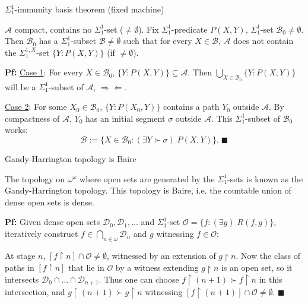 \begin{frame}{$\Sigma_1^{1}$-immunity basis theorem (fixed machine)}
  \begin{lemma}
    $\mathcal{A}$ compact, contains no $\Sigma_1^{1}$-set
    ($\neq\emptyset$). Fix $\Sigma_1^{1}$-predicate $P(X,Y)$,
    $\Sigma_1^{1}$-set $\mathcal{B}_0\neq\emptyset$. Then
    $\mathcal{B}_0$ has a $\Sigma_1^{1}$-subset
    $\mathcal{B}\neq\emptyset$ such that for every $X\in\mathcal{B}$,
    $\mathcal{A}$ does not contain the $\Sigma_1^{1,X}$-set
    $\{Y:P(X,Y)\}$ (if $\neq\emptyset$).
  \end{lemma}

  \vspace{1em}
  \textbf{Pf:} \underline{Case 1}: For every $X\in\mathcal{B}_0$,
  $\{Y:P(X,Y)\}\subseteq\mathcal{A}$. Then $\bigcup_{X\in\mathcal{B}_0}
  \{Y:P(X,Y)\}$ will be a $\Sigma_1^{1}$-subset of $\mathcal{A}$,
  $\Rightarrow\Leftarrow$.

  \vspace{1em}
  \underline{Case 2}: For some $X_0\in\mathcal{B}_0$, $\{Y:P(X_0,Y)\}$
  contains a path $Y_0$ outside $\mathcal{A}$. By compactness of
  $\mathcal{A}$, $Y_0$ has an initial segment $\sigma$ outside
  $\mathcal{A}$. This $\Sigma_1^{1}$-subset of $\mathcal{B}_0$ works:
  \[\mathcal{B}:= \{X\in\mathcal{B}_0: (\exists Y\succ\sigma)\; P(X,Y)\}.\;
  \blacksquare\]
\end{frame}

\begin{frame}{Gandy-Harrington topology is Baire}
  \begin{thm}
    \label{thm:gandy-harrington}
    The topology on $\omega^\omega$ where open sets are generated by the
    $\Sigma_1^{1}$-sets is known as the Gandy-Harrington topology.  This
    topology is Baire, i.e. the countable union of dense open sets is
    dense.
  \end{thm}

  \vspace{1em}
  \textbf{Pf:} Given dense open sets
  $\mathcal{D}_0,\mathcal{D}_1,\ldots$ and
  $\Sigma_1^1$-set $\mathcal{O}=\{f:(\exists g)\; R(f,g)\}$, iteratively
  construct $f\in\bigcap_{n\in\omega}\mathcal{D}_n$ and $g$ witnessing
  $f\in\mathcal{O}$:
  
  \vspace{1em}
  At stage $n$, $[f\restriction n]\cap\mathcal{O} \neq\emptyset$, witnessed
  by an extension of $g\restriction n$. Now the class of paths in
  $[f\restriction n]$ that lie in $\mathcal{O}$ by a witness extending
  $g\restriction n$ is an open set, so it intersects
  $\mathcal{D}_0\cap\ldots\cap\mathcal{D}_{n+1}$. Thus one can choose
  $f\restriction (n+1) \succ f\restriction n$ in this intersection, and
  $g\restriction (n+1) \succ g\restriction n$ witnessing $[f\restriction
  (n+1)]\cap\mathcal{O} \neq\emptyset$. $\blacksquare$
\end{frame}

